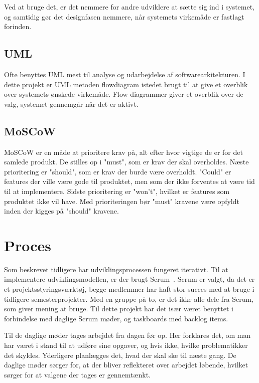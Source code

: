 \noindent Ved at bruge det, er det nemmere for andre udviklere at sætte sig ind i systemet, og samtidig gør det designfasen nemmere, når systemets virkemåde er fastlagt forinden.

\subsection{UML}
Ofte benyttes UML mest til analyse og udarbejdelse af softwarearkitekturen. I dette projekt er UML metoden flowdiagram istedet brugt til at give et overblik over systemets ønskede virkemåde. Flow diagrammer giver et overblik over de valg, systemet gennemgår når det er aktivt.   

\subsection{MoSCoW} 
MoSCoW er en måde at prioritere krav på, alt efter hvor vigtige de er for det samlede produkt.  
De stilles op i "must", som er krav der skal overholdes. Næste prioritering er "should", som er krav der burde være overholdt. "Could" er features der ville være gode til produktet, men som der ikke forventes at være tid til at implementere. Sidste prioritering er "won't", hvilket er features som produktet ikke vil have. Med prioriteringen bør "must" kravene være opfyldt inden der kigges på "should" kravene. 

\section{Proces}
Som beskrevet tidligere har udviklingsprocessen fungeret iterativt. Til at implementere udviklingsmodellen, er der brugt Scrum~\cite{Scrum}. Scrum er valgt, da det er et projektsstyringsværktøj, begge medlemmer har haft stor succes med at bruge i tidligere semesterprojekter. Med en gruppe på to, er det ikke alle dele fra Scrum, som giver mening at bruge. Til dette projekt har det især været benyttet i forbindelse med daglige Scrum møder, og taskboards med backlog items. 

Til de daglige møder tages arbejdet fra dagen før op. Her forklares det, om man har været i stand til at udføre sine opgaver, og hvis ikke, hvilke problematikker det skyldes. Yderligere planlægges det, hvad der skal ske til næste gang. De daglige møder sørger for, at der bliver reflekteret over arbejdet løbende, hvilket sørger for at valgene der tages er gennemtænkt. 

